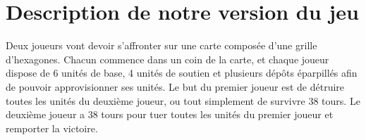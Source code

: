 \section{Description de notre version du jeu}
Deux joueurs vont devoir s'affronter sur une carte composée d'une grille d'hexagones.
Chacun commence dans un coin de la carte, et chaque joueur dispose de 6 unités de base, 4 unités de soutien et plusieurs dépôts éparpillés afin de pouvoir approvisionner ses unités.
Le but du premier joueur est de détruire toutes les unités du deuxième joueur, ou tout simplement de survivre 38 tours.
Le deuxième joueur a 38 tours pour tuer toutes les unités du premier joueur et remporter la victoire.

